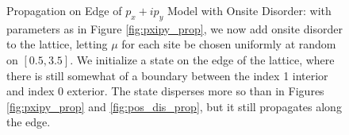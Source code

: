 \documentclass[a4paper]{article}
\begin{document}
\begin{figure}
%
%

%
%
\caption{Propagation on Edge of $p_x + ip_y$ Model with Onsite Disorder: with parameters as in Figure \ref{fig:pxipy_prop}, we now add onsite disorder to the lattice, letting $\mu$ for each site be chosen uniformly at random on $[0.5,3.5]$.
We initialize a state on the edge of the lattice, where there is still somewhat of a boundary between the index 1 interior and index 0 exterior.
The state disperses more so than in Figures \ref{fig:pxipy_prop} and \ref{fig:pos_dis_prop}, but it still propagates along the edge.
}%
\label{fig:mu_dis_edge_prop}%
\end{figure}
\end{document}
